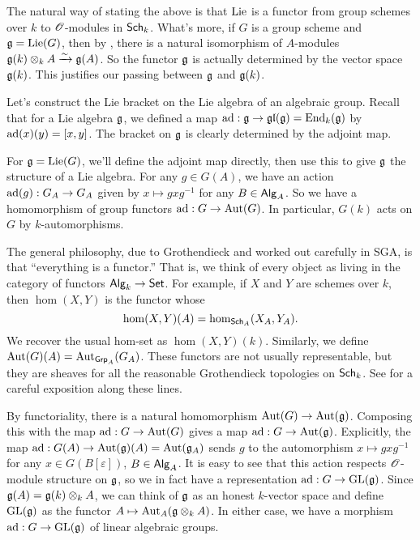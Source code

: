 \begin{hard}
The natural way of stating the above is that $\operatorname{Lie}$ is a functor from group 
schemes over $k$ to $\mathscr{O}$-modules in $\mathsf{Sch}_{k}$. What's more, if $G$ is a 
group scheme and $\mathfrak{g}=\operatorname{Lie}(G)$, then by \cite[II 3.3]{sga3-i}, 
there is a natural isomorphism of $A$-modules 
$\mathfrak{g}(k)\otimes_k A\xrightarrow\sim \mathfrak{g}(A)$. So the functor $\mathfrak{g}$ is actually determined 
by the vector space $\mathfrak{g}(k)$. This justifies our passing between 
$\mathfrak{g}$ and $\mathfrak{g}(k)$. 
\end{hard}

Let's construct the Lie bracket on the Lie algebra of an algebraic group. 
Recall that for a Lie algebra $\mathfrak{g}$, we defined a map 
$\operatorname{ad}:\mathfrak{g}\to \mathfrak{gl}(\mathfrak{g}) = \operatorname{End}_k(\mathfrak{g})$ by $\operatorname{ad}(x)(y)=[x,y]$. The 
bracket on $\mathfrak{g}$ is clearly determined by the adjoint map. 

For $\mathfrak{g}=\operatorname{Lie}(G)$, we'll define the adjoint map directly, then use this to 
give $\mathfrak{g}$ the structure of a Lie algebra. For any $g\in G(A)$, we have an 
action $\operatorname{ad}(g):G_A\to G_A$ given by $x\mapsto g x g^{-1}$ for any 
$B\in \mathsf{Alg}_{A}$. So we have a homomorphism of group functors 
$\operatorname{ad}:G\to \operatorname{Aut}(G)$. In particular, $G(k)$ acts on $G$ by 
$k$-automorphisms. 

\begin{hard}
The general philosophy, due to Grothendieck and worked out carefully in 
SGA, is that ``everything is a functor.'' That is, we think of every object 
as living in the category of functors $\mathsf{Alg}_{k}\to \mathsf{Set}$. For example, 
if $X$ and $Y$ are schemes over $k$, then $\hom(X,Y)$ is the functor whose 
\[
  \hom(X,Y)(A) = \hom_{\mathsf{Sch}_{A}}(X_A, Y_A) .
\]
We recover the usual hom-set as $\hom(X,Y)(k)$. Similarly, we define 
$\operatorname{Aut}(G)(A)=\operatorname{Aut}_{\mathsf{Grp}_A}(G_A)$. These functors are not 
usually representable, but they are sheaves for all the reasonable Grothendieck 
topologies on $\mathsf{Sch}_{k}$. See \cite[I \S 1--3, II \S 1]{sga3-i} for a careful 
exposition along these lines. 
\end{hard}

By functoriality, there is a natural homomorphism 
$\operatorname{Aut}(G)\to \operatorname{Aut}(\mathfrak{g})$. Composing this with the map 
$\operatorname{ad}:G\to \operatorname{Aut}(G)$ gives a map 
$\operatorname{ad}:G\to \operatorname{Aut}(\mathfrak{g})$. Explicitly, the map 
$\operatorname{ad}:G(A)\to \operatorname{Aut}(\mathfrak{g})(A)=\operatorname{Aut}(\mathfrak{g}_A)$ sends 
$g$ to the automorphism $x\mapsto g x g^{-1}$ for any 
$x\in G(B[\varepsilon])$, $B\in \mathsf{Alg}_{A}$. It is easy to see that this 
action respects $\mathscr{O}$-module structure on $\mathfrak{g}$, so we in fact have a 
representation $\operatorname{ad}:G\to \operatorname{GL}(\mathfrak{g})$. Since 
$\mathfrak{g}(A)=\mathfrak{g}(k)\otimes_k A$, we can think of $\mathfrak{g}$ as an honest 
$k$-vector space and define $\operatorname{GL}(\mathfrak{g})$ as the functor 
$A\mapsto \operatorname{Aut}_A(\mathfrak{g}\otimes_k A)$. In either case, we have a 
morphism $\operatorname{ad}:G\to \operatorname{GL}(\mathfrak{g})$ of linear algebraic groups. 

